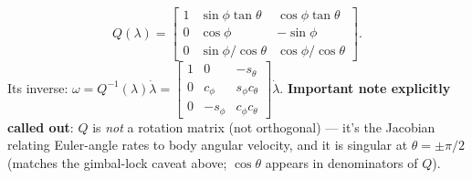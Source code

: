 \documentclass[11pt]{article}
\begin{document}
\[Q(\lambda)=\begin{bmatrix}1&\sin\phi\tan\theta&\cos\phi\tan\theta\\0&\cos\phi&-\sin\phi\\0&\sin\phi/\cos\theta&\cos\phi/\cos\theta\end{bmatrix}.\]
Its inverse: $\omega = Q^{-1}(\lambda)\dot\lambda = \begin{bmatrix}1&0&-s_\theta\\0&c_\phi&s_\phi c_\theta\\0&-s_\phi&c_\phi c_\theta\end{bmatrix}\dot\lambda$.
\textbf{Important note explicitly called out}: $Q$ is \textit{not} a rotation matrix (not orthogonal) — it's the Jacobian relating Euler-angle rates to body angular velocity, and it is singular at $\theta=\pm\pi/2$ (matches the gimbal-lock caveat above; $\cos\theta$ appears in denominators of $Q$).
\end{document}
